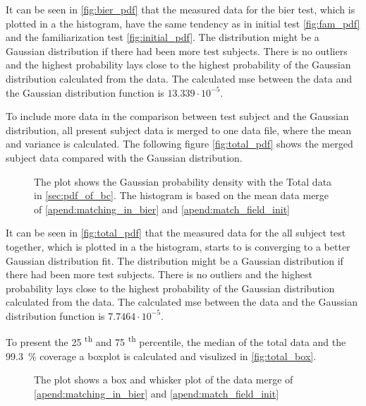 It can be seen in \autoref{fig:bier_pdf} that the measured data for the \gls{bier} test, which is plotted in a the histogram, have the same tendency as in initial test \autoref{fig:fam_pdf} and the familiarization test \autoref{fig:initial_pdf}. The distribution might be a Gaussian distribution if there had been more test subjects. There is no outliers and the highest probability lays close to the highest probability of the Gaussian distribution calculated from the data. The calculated \gls{mse} between the data and the Gaussian distribution function is $13.339 \cdot 10^{-5}$.



To include more data in the comparison between test subject and the Gaussian distribution, all present subject data is merged to one data file, where the mean and variance is calculated. The following figure \autoref{fig:total_pdf} shows the merged subject data compared with the Gaussian distribution.

 \begin{figure}[H]
	\centering
	
		\caption{The plot shows the Gaussian probability density with the Total data in \autoref{sec:pdf_of_bc}. The histogram is based on the mean data merge of \autoref{apend:matching_in_bier} and \autoref{apend:match_field_init}}
		\label{fig:total_pdf}
\end{figure}

It can be seen in \autoref{fig:total_pdf} that the measured data for the all subject test together, which is plotted in a the histogram, starts to is converging to a better Gaussian distribution fit. The distribution might be a Gaussian distribution if there had been more test subjects. There is no outliers and the highest probability lays close to the highest probability of the Gaussian distribution calculated from the data. The calculated \gls{mse} between the data and the Gaussian distribution function is $7.7464 \cdot 10^{-5}$.

To present the 25 \textsuperscript{th} and 75 \textsuperscript{th} percentile, the median of the total data and the \SI{99.3}{\percent} coverage a boxplot is calculated and visulized in \autoref{fig:total_box}.

 \begin{figure}[H]
	\centering
	
		\caption{The plot shows a box and whisker plot of the data merge of \autoref{apend:matching_in_bier} and \autoref{apend:match_field_init}}
		\label{fig:total_box}
\end{figure}

